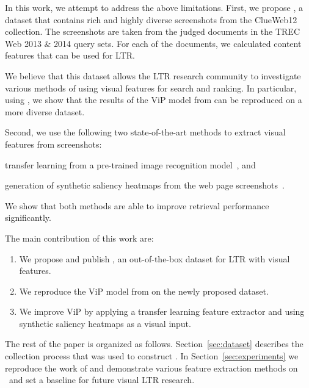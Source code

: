 
In this work, we attempt to address the above limitations.
First, we propose \datasetname, a dataset that contains rich and highly diverse screenshots from the ClueWeb12 collection. The screenshots are taken from the judged documents in the TREC Web 2013 \& 2014 query sets. For each of the documents, we calculated content features that can be used for \ac{LTR}.

We believe that this dataset allows the \ac{LTR} research community to investigate various methods of using visual features for search and ranking.
In particular, using \datasetname, we show that the results of the ViP model from \citet{fan2017learning} can be reproduced on a more diverse dataset.

Second, we use the following two state-of-the-art methods to extract visual features from screenshots:
\begin{inparaenum}[(i)]
\item transfer learning from a pre-trained image recognition model~\cite{donahue2014decaf,simonyan2014very}, and
\item generation of synthetic saliency heatmaps from the web page screenshots~\cite{shen2014webpage,shan2017two}.
\end{inparaenum}
We show that both methods are able to improve retrieval performance significantly.

The main contribution of this work are:
\begin{enumerate}  
\item We propose and publish \datasetname, an out-of-the-box dataset for \ac{LTR} with visual features.
\item We reproduce the ViP model from \cite{fan2017learning} on the newly proposed dataset.
\item We improve ViP by applying a transfer learning feature extractor and using synthetic saliency heatmaps as a visual input.
\end{enumerate}

 The rest of the paper is organized as follows. Section~\ref{sec:dataset} describes the collection process that was used to construct \datasetname. In Section~\ref{sec:experiments} we reproduce the work of \citet{fan2017learning} and demonstrate various feature extraction methods on \datasetname~and set a baseline for future visual \ac{LTR} research.  